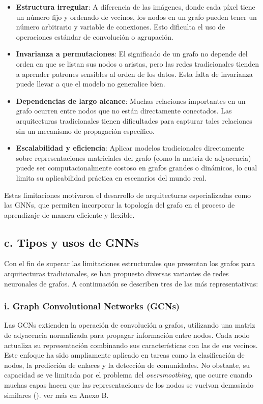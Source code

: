 \documentclass[11pt]{article} %
\begin{document}
\begin{itemize}
    \item \textbf{Estructura irregular}: A diferencia de las imágenes, donde cada píxel tiene un número fijo y ordenado de vecinos, los nodos en un grafo pueden tener un número arbitrario y variable de conexiones. Esto dificulta el uso de operaciones estándar de convolución o agrupación.

    \item \textbf{Invarianza a permutaciones}: El significado de un grafo no depende del orden en que se listan sus nodos o aristas, pero las redes tradicionales tienden a aprender patrones sensibles al orden de los datos. Esta falta de invarianza puede llevar a que el modelo no generalice bien.

    \item \textbf{Dependencias de largo alcance}: Muchas relaciones importantes en un grafo ocurren entre nodos que no están directamente conectados. Las arquitecturas tradicionales tienen dificultades para capturar tales relaciones sin un mecanismo de propagación específico.

    \item \textbf{Escalabilidad y eficiencia}: Aplicar modelos tradicionales directamente sobre representaciones matriciales del grafo (como la matriz de adyacencia) puede ser computacionalmente costoso en grafos grandes o dinámicos, lo cual limita su aplicabilidad práctica en escenarios del mundo real.
\end{itemize}

Estas limitaciones motivaron el desarrollo de arquitecturas especializadas como las GNNs, que permiten incorporar la topología del grafo en el proceso de aprendizaje de manera eficiente y flexible.

\subsection{c. Tipos y usos de GNNs}
\vspace{3pt}
Con el fin de superar las limitaciones estructurales que presentan los grafos para arquitecturas tradicionales, se han propuesto diversas variantes de redes neuronales de grafos. A continuación se describen tres de las más representativas:
    
\subsubsection{i. Graph Convolutional Networks (GCNs)}
Las GCNs extienden la operación de convolución a grafos, utilizando una matriz de adyacencia normalizada para propagar información entre nodos. Cada nodo actualiza su representación combinando sus características con las de sus vecinos. Este enfoque ha sido ampliamente aplicado en tareas como la clasificación de nodos, la predicción de enlaces y la detección de comunidades. No obstante, su capacidad se ve limitada por el problema del \textit{oversmoothing}, que ocurre cuando muchas capas hacen que las representaciones de los nodos se vuelvan demasiado similares (\cite{kipf2016semi}). ver más en Anexo B.
\end{document}
